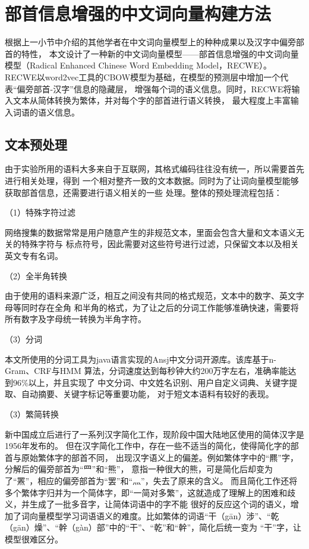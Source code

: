 \section{部首信息增强的中文词向量构建方法}
根据上一小节中介绍的其他学者在中文词向量模型上的种种成果以及汉字中偏旁部首的特性，
本文设计了一种新的中文词向量模型——部首信息增强的中文词向量模型（Radical Enhanced Chinese Word Embedding Model，RECWE）。
RECWE以word2vec工具的CBOW模型为基础，在模型的预测层中增加一个代表“偏旁部首-汉字”信息的隐藏层，
增强每个词的语义信息。同时，RECWE将输入文本从简体转换为繁体，并对每个字的部首进行语义转换，
最大程度上丰富输入词语的语义信息。
\subsection{文本预处理}
由于实验所用的语料大多来自于互联网，其格式编码往往没有统一，所以需要首先进行相关处理，得到
一个相对整齐一致的文本数据。同时为了让词向量模型能够获取部首信息，还需要进行语义相关的一些
处理。整体的预处理流程包括：

（1）特殊字符过滤

网络搜集的数据常常是用户随意产生的非规范文本，里面会包含大量和文本语义无关的特殊字符与
标点符号，因此需要对这些符号进行过滤，只保留文本以及相关英文专有名词。

（2）全半角转换

由于使用的语料来源广泛，相互之间没有共同的格式规范，文本中的数字、英文字母等同时存在全角
和半角的格式，为了让之后的分词工作能够准确快速，需要将所有数字及字母统一转换为半角字符。

（3）分词

本文所使用的分词工具为java语言实现的Ansj中文分词开源库。该库基于n-Gram、CRF与HMM
算法，分词速度达到每秒钟大约200万字左右，准确率能达到96\%以上，并且实现了
中文分词、中文姓名识别、用户自定义词典、关键字提取、自动摘要、关键字标记等重要功能，
对于短文本语料有较好的表现。

（3）繁简转换

新中国成立后进行了一系列汉字简化工作，现阶段中国大陆地区使用的简体汉字是1956年发布的。
但在汉字简化工作中，存在一些不适当的简化，使得简化字的部首与原始繁体字的部首不同，
出现汉字语义上的偏差。例如繁体字中的“羆”字，分解后的偏旁部首为“罒”和“熊”，
意指一种很大的熊，可是简化后却变为了“罴”，相应的偏旁部首为“罢”和“灬”，失去了原来的含义。
而且简化工作还将多个繁体字归并为一个简体字，即“一简对多繁”，这就造成了理解上的困难和歧义，并生成了一批多音字，让简体词语中的字不能
很好的反应这个词的语义，增加了词向量模型学习词语语义的难度。比如繁体的词语“干（gān）涉”、“乾（gān）燥”、“幹（gàn）部”中的“干”、“乾”和“幹”，简化后统一变为
“干”字，让模型很难区分。

